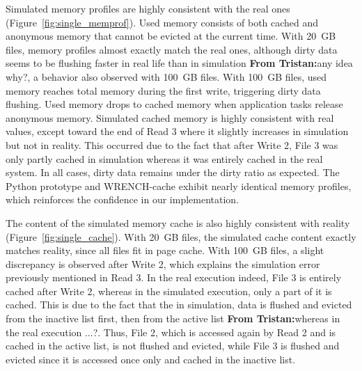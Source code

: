 \documentclass[conference]{IEEEtran}
\newcommand{\tristan}[1]{\color{orange}\textbf{From Tristan:}#1\color{black}}
\newcommand{\wrench}{WRENCH\xspace}
\begin{document}
        Simulated memory profiles are highly consistent with the real ones
        (Figure~\ref{fig:single_memprof}). Used memory consists of both
        cached and anonymous memory that cannot be evicted at the current
        time. With 20~GB files, memory profiles almost exactly match the
        real ones, although dirty data seems to be flushing faster in real
        life than in simulation \tristan{any idea why?}, a behavior also
        observed with 100~GB files. With 100~GB files, used memory reaches
        total memory during the first write, triggering dirty data
        flushing. Used memory drops to cached memory when application tasks
        release anonymous memory. Simulated cached memory is highly
        consistent with real values, except toward the end of Read 3 where
        it slightly increases in simulation but not in reality. This
        occurred due to the fact that after Write 2, File 3 was only partly
        cached in simulation whereas it was entirely cached in the real
        system. In all cases, dirty data remains under the dirty ratio as
        expected. The Python prototype and \wrench-cache exhibit nearly
        identical memory profiles, which reinforces the confidence in our
        implementation.

        The content of the simulated memory cache is also highly consistent
        with reality (Figure~\ref{fig:single_cache}). With 20~GB files, the
        simulated cache content exactly matches reality, since all files fit in page cache. With 100~GB files, a slight
        discrepancy is observed after Write 2, which explains the
        simulation error previously mentioned in Read 3. In the real execution indeed,
        File 3 is entirely cached after Write 2, whereas in the simulated execution, 
        only a part of it is cached. 
        This is due to the fact that the in simulation, data is flushed and evicted 
        from the inactive list first, then from the active list \tristan{whereas in the real execution ...?}. Thus, File 2, which is 
        accessed again by Read 2 and is cached in the active list, is not flushed and evicted, 
        while File 3 is flushed and evicted since it is accessed once only and cached 
        in the inactive list. 

\end{document}
